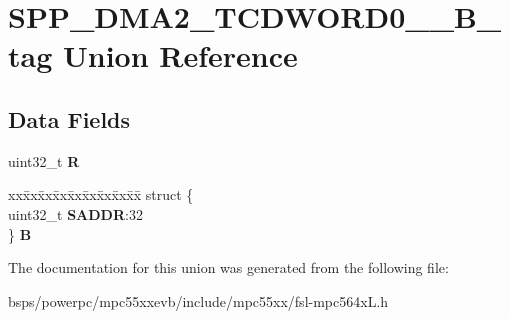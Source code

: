 \hypertarget{unionSPP__DMA2__TCDWORD0____32B__tag}{}\section{S\+P\+P\+\_\+\+D\+M\+A2\+\_\+\+T\+C\+D\+W\+O\+R\+D0\+\_\+\+\_\+B\+\_\+tag Union Reference}
\label{unionSPP__DMA2__TCDWORD0____32B__tag}
\subsection*{Data Fields}
\begin{DoxyCompactItemize}
\item 
\mbox{\label{unionSPP__DMA2__TCDWORD0____32B__tag_a2ba1494e7ac2704aac6048a758a0ef57}} 
uint32\+\_\+t {\bfseries R}
\item 
\mbox{\label{unionSPP__DMA2__TCDWORD0____32B__tag_afd7c517eb7b7e7a6722837f4999a8f81}} 
\begin{tabbing}
xx\=xx\=xx\=xx\=xx\=xx\=xx\=xx\=xx\=\kill
struct \{\\
\>uint32\_t {\bfseries SADDR}:32\\
\} {\bfseries B}\\

\end{tabbing}\end{DoxyCompactItemize}


The documentation for this union was generated from the following file\+:\begin{DoxyCompactItemize}
\item 
bsps/powerpc/mpc55xxevb/include/mpc55xx/fsl-\/mpc564x\+L.\+h\end{DoxyCompactItemize}
